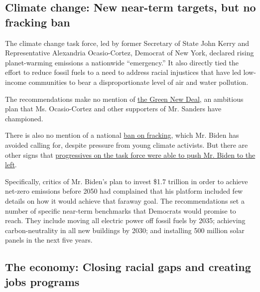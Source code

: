 \hypertarget{climate-change-new-near-term-targets-but-no-fracking-ban}{%
\subsection{Climate change: New near-term targets, but no fracking
ban}\label{climate-change-new-near-term-targets-but-no-fracking-ban}}

The climate change task force, led by former Secretary of State John
Kerry and Representative Alexandria Ocasio-Cortez, Democrat of New York,
declared rising planet-warming emissions a nationwide ``emergency.'' It
also directly tied the effort to reduce fossil fuels to a need to
address racial injustices that have led low-income communities to bear a
disproportionate level of air and water pollution.

The recommendations make no mention of
\href{https://www.nytimes3xbfgragh.onion/2019/02/21/climate/green-new-deal-questions-answers.html}{the
Green New Deal}, an ambitious plan that Ms. Ocasio-Cortez and other
supporters of Mr. Sanders have championed.

There is also no mention of a national
\href{https://www.nytimes3xbfgragh.onion/2020/01/27/us/politics/pennsylvania-democrats-fracking.html}{ban
on fracking}, which Mr. Biden has avoided calling for, despite pressure
from young climate activists. But there are other signs that
\href{https://www.nytimes3xbfgragh.onion/2020/07/06/us/politics/joe-biden-climate-change.html}{progressives
on the task force were able to push Mr. Biden to the left}.

Specifically, critics of Mr. Biden's plan to invest \$1.7 trillion in
order to achieve net-zero emissions before 2050 had complained that his
platform included few details on how it would achieve that faraway goal.
The recommendations set a number of specific near-term benchmarks that
Democrats would promise to reach. They include moving all electric power
off fossil fuels by 2035; achieving carbon-neutrality in all new
buildings by 2030; and installing 500 million solar panels in the next
five years.

\hypertarget{the-economy-closing-racial-gaps-and-creating-jobs-programs}{%
\subsection{The economy: Closing racial gaps and creating jobs
programs}\label{the-economy-closing-racial-gaps-and-creating-jobs-programs}}

